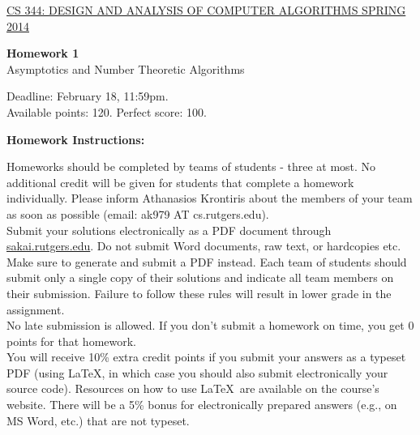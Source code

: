 \documentclass{article}
\begin{document}
\sloppy

\noindent \underline{CS 344: DESIGN AND ANALYSIS OF COMPUTER
  ALGORITHMS \hspace{1.6in} SPRING 2014}

\vspace{0.1in}

\begin{center}
{\bf {\large Homework 1}}\\
Asymptotics and Number Theoretic Algorithms\\
\end{center}

\vspace{0.1in}

\noindent Deadline: February 18, 11:59pm.\\ 
Available points: 120. Perfect score: 100.\\

\begin{center}
{\bf Homework Instructions:}
\end{center}

 Homeworks should be completed by teams of
students - three at most. No additional credit will be given for
students that complete a homework individually. Please inform
Athanasios Krontiris about the members of your team as soon as
possible (email: ak979 AT cs.rutgers.edu).\\

 Submit your solutions electronically
as a PDF document through \url{sakai.rutgers.edu}. Do not submit Word
documents, raw text, or hardcopies etc. Make sure to generate and
submit a PDF instead. Each team of students should submit only a
single copy of their solutions and indicate all team members on their
submission.  Failure to follow these rules will result in lower grade
in the assignment.\\

 No late submission is allowed. If
you don't submit a homework on time, you get 0 points for that
homework.\\

 You will receive 10\% extra
credit points if you submit your answers as a typeset PDF (using
\LaTeX, in which case you should also submit electronically your
source code). Resources on how to use \LaTeX\ are available on the
course's website. There will be a 5\% bonus for electronically
prepared answers (e.g., on MS Word, etc.) that are not typeset.\\
\end{document}

